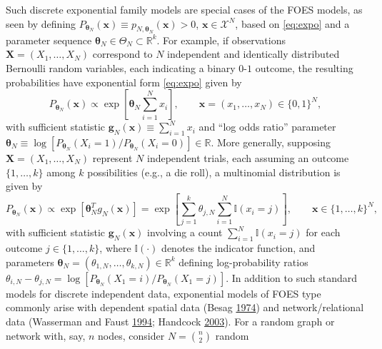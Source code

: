 \documentclass[]{article}
\theoremstyle{definition}
\begin{document}
Such discrete exponential family models are special cases of the FOES
models, as seen by defining
\(P_{\boldsymbol \theta_N}(\boldsymbol x)\equiv p_{N,\boldsymbol \theta_N}(\boldsymbol x)> 0\),
\(\boldsymbol x \in \mathcal{X}^N\), based on \eqref{eq:expo} and a
parameter sequence
\(\boldsymbol \theta_N \in \Theta_N \subset \mathbb{R}^k\). For example,
if observations \(\boldsymbol X = (X_1,\ldots,X_N)\) correspond to \(N\)
independent and identically distributed Bernoulli random variables, each
indicating a binary \(0\)-\(1\) outcome, the resulting probabilities
have exponential form \eqref{eq:expo} given by
\begin{equation}
\label{eq:mod1}
P_{\boldsymbol \theta_N}(\boldsymbol x) \propto
 \exp\left[\boldsymbol \theta_N \sum_{i=1}^N x_i\right], \qquad \boldsymbol x=(x_1,\ldots,x_N) \in\{0,1\}^N, 
 \end{equation}
with sufficient statistic
\(\boldsymbol g_N(\boldsymbol x)\equiv \sum_{i=1}^N x_i\) and ``log odds
ratio'' parameter
\(\boldsymbol \theta_N \equiv \log[ P_{\boldsymbol \theta_N}(X_i=1)/P_{\boldsymbol \theta_N}(X_i=0) ] \in \mathbb{R}\).
More generally, supposing \(\boldsymbol X =(X_1,\ldots,X_N)\) represent
\(N\) independent trials, each assuming an outcome \(\{1,\ldots,k\}\)
among \(k\) possibilities (e.g., a die roll), a multinomial distribution
is given by
\begin{equation}
\label{eq:mod11}
P_{\boldsymbol \theta_N}(\boldsymbol x) \propto  \exp\left[  \boldsymbol \theta_{N}^T g_N(\boldsymbol x)   \right] =
\exp\left[ \sum_{j=1}^k {\theta_{j,N}} \sum_{i=1}^N \mathbb{I}(x_i=j) \right], \qquad \boldsymbol x  \in\{1,\ldots,k\}^N, 
\end{equation}
with sufficient statistic \(\boldsymbol g_N(\boldsymbol x)\) involving a
count \(\sum_{i=1}^N \mathbb{I}(x_i=j)\) for each outcome
\(j \in \{1,\ldots,k\}\), where \(\mathbb{I}(\cdot)\) denotes the
indicator function, and parameters
\(\boldsymbol \theta_N=(\theta_{1,N},\ldots,\theta_{k,N})\in\mathbb{R}^k\)
defining log-probability ratios
\(\theta_{i,N}-\theta_{j,N} =\log [P_{\boldsymbol \theta_N}(X_1=i)/P_{\boldsymbol \theta_N}(X_1=j)]\).
In addition to such standard models for discrete independent data,
exponential models of FOES type commonly arise with dependent spatial
data (Besag \protect\hyperlink{ref-besag1974spatial}{1974}) and
network/relational data (Wasserman and Faust
\protect\hyperlink{ref-wasserman1994social}{1994}; Handcock
\protect\hyperlink{ref-handcock2003assessing}{2003}). For a random graph
or network with, say, \(n\) nodes, consider \(N={n \choose 2}\) random
\end{document}
